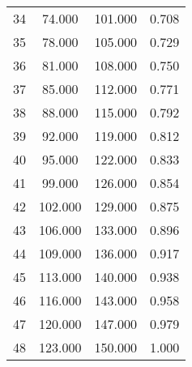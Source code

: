 \begin{tabular}{cccc}
  34 & 74.000 & 101.000 & 0.708 \\ 
  35 & 78.000 & 105.000 & 0.729 \\ 
  36 & 81.000 & 108.000 & 0.750 \\ 
  37 & 85.000 & 112.000 & 0.771 \\ 
  38 & 88.000 & 115.000 & 0.792 \\ 
  39 & 92.000 & 119.000 & 0.812 \\ 
  40 & 95.000 & 122.000 & 0.833 \\ 
  41 & 99.000 & 126.000 & 0.854 \\ 
  42 & 102.000 & 129.000 & 0.875 \\ 
  43 & 106.000 & 133.000 & 0.896 \\ 
  44 & 109.000 & 136.000 & 0.917 \\ 
  45 & 113.000 & 140.000 & 0.938 \\ 
  46 & 116.000 & 143.000 & 0.958 \\ 
  47 & 120.000 & 147.000 & 0.979 \\ 
  48 & 123.000 & 150.000 & 1.000 \\ 
   \hline
\end{tabular}
